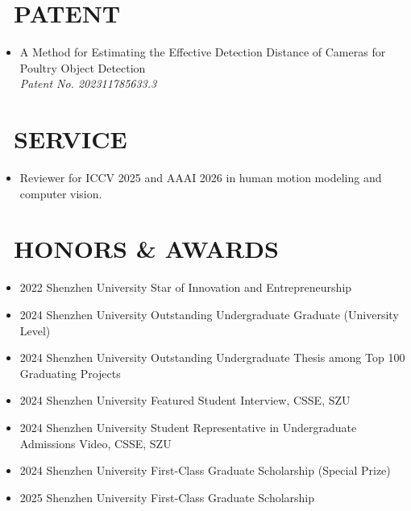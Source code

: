 \documentclass{resume}
\begin{document}
\section{\texorpdfstring {\faLightbulbO \ PATENT}{PATENT}}
\begin{itemize}
  \item A Method for Estimating the Effective Detection Distance of Cameras for Poultry Object Detection\\
  \textit{Patent No. 202311785633.3}
\end{itemize}

\section{\texorpdfstring{\faCommentsO \ SERVICE}{SERVICE}}
\begin{itemize}
  \item Reviewer for ICCV 2025 and AAAI 2026 in human motion modeling and computer vision.
\end{itemize}

\section{\texorpdfstring{\faStar \ HONORS \& AWARDS}{Honors \& AWARDS}}
\begin{itemize}
  \item 2022 \hspace{0.5cm} Shenzhen University \hspace{0.5cm} Star of Innovation and Entrepreneurship
  \item 2024 \hspace{0.5cm} Shenzhen University \hspace{0.5cm} Outstanding Undergraduate Graduate (University Level)
  \item 2024 \hspace{0.5cm} Shenzhen University \hspace{0.5cm} Outstanding Undergraduate Thesis among Top 100 Graduating Projects
  \item 2024 \hspace{0.5cm} Shenzhen University \hspace{0.5cm} Featured Student Interview, CSSE, SZU
  \item 2024 \hspace{0.5cm} Shenzhen University \hspace{0.5cm} Student Representative in Undergraduate Admissions Video, CSSE, SZU
  \item 2024 \hspace{0.5cm} Shenzhen University \hspace{0.5cm} First-Class Graduate Scholarship (Special Prize)
  \item 2025 \hspace{0.5cm} Shenzhen University \hspace{0.5cm} First-Class Graduate Scholarship
\end{itemize}
\end{document}
